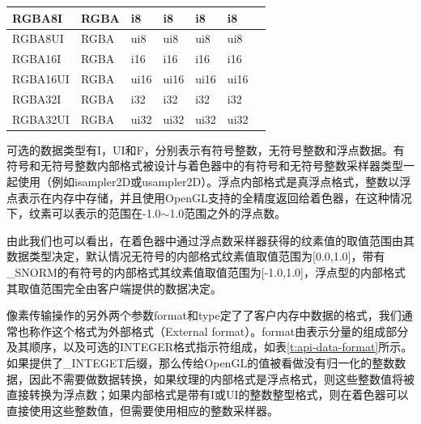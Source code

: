 \begin{longtable}{>{\small}p{}|>{\small}p{}|>{\small}p{}|>{\small}p{}|>{\small}p{}|>{\small}p{}|>{\small}p{}}
  RGBA8I          & RGBA & i8 & i8 & i8 & i8 &\\\hline
  RGBA8UI         & RGBA & ui8 & ui8 & ui8 & ui8 &\\\hline
  RGBA16I         & RGBA & i16 & i16& i16& i16 &\\\hline
  RGBA16UI        & RGBA & ui16& ui16& ui16& ui16&\\\hline
  RGBA32I         & RGBA & i32 & i32 & i32& i32&\\\hline
  RGBA32UI        & RGBA & ui32 & ui32& ui32& ui32&\\

 \hline 
\end{longtable}

可选的数据类型有I，UI和F，分别表示有符号整数，无符号整数和浮点数据。有符号和无符号整数内部格式被设计与着色器中的有符号和无符号整数采样器类型一起使用（例如isampler2D或usampler2D）。浮点内部格式是真浮点格式，整数以浮点表示在内存中存储，并且使用OpenGL支持的全精度返回给着色器，在这种情况下，纹素可以表示的范围在-1.0$\sim$1.0范围之外的浮点数。

由此我们也可以看出，在着色器中通过浮点数采样器获得的纹素值的取值范围由其数据类型决定，默认情况无符号的内部格式纹素值取值范围为[0.0,1.0]，带有\_SNORM的有符号的内部格式其纹素值取值范围为[-1.0,1.0]，浮点型的内部格式其取值范围完全由客户端提供的数据决定。

像素传输操作的另外两个参数format和type定了了客户内存中数据的格式，我们通常也称作这个格式为外部格式（External format）。format由表示分量的组成部分及其顺序，以及可选的INTEGER格式指示符组成，如表\ref{t:api-data-format}所示。如果提供了\_INTEGET后缀，那么传给OpenGL的值被看做没有归一化的整数数据，因此不需要做数据转换，如果纹理的内部格式是浮点格式，则这些整数值将被直接转换为浮点数；如果内部格式是带有I或UI的整数整型格式，则在着色器可以直接使用这些整数值，但需要使用相应的整数采样器。

